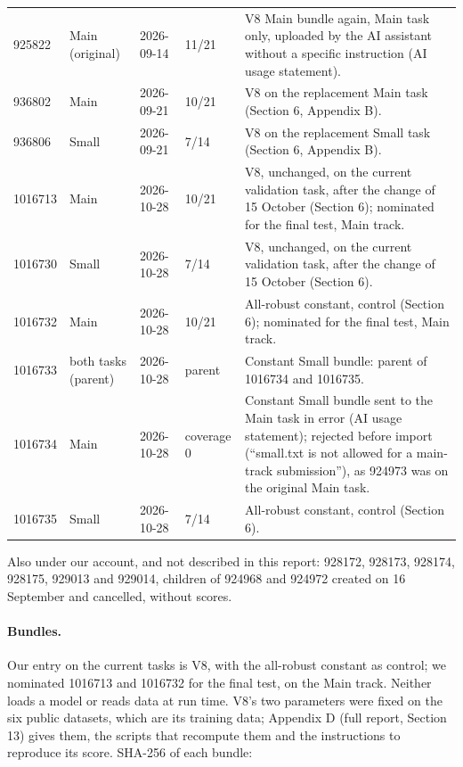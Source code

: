 {\begin{longtable}{L{1.3cm}L{1.9cm}L{1.7cm}L{1.5cm}L{5.9cm}}
925822 & Main (original) & 2026-09-14 & 11/21 & V8 Main bundle again, Main task only, uploaded by the AI assistant without a specific instruction (AI usage statement). \\

936802 & Main & 2026-09-21 & 10/21 & V8 on the replacement Main task (Section 6, Appendix B). \\

936806 & Small & 2026-09-21 & 7/14 & V8 on the replacement Small task (Section 6, Appendix B). \\

1016713 & Main & 2026-10-28 & 10/21 & V8, unchanged, on the current validation task, after the change of 15 October (Section 6); nominated for the final test, Main track. \\

1016730 & Small & 2026-10-28 & 7/14 & V8, unchanged, on the current validation task, after the change of 15 October (Section 6). \\

1016732 & Main & 2026-10-28 & 10/21 & All-robust constant, control (Section 6); nominated for the final test, Main track. \\

1016733 & both tasks (parent) & 2026-10-28 & parent & Constant Small bundle: parent of 1016734 and 1016735. \\

1016734 & Main & 2026-10-28 & coverage 0 & Constant Small bundle sent to the Main task in error (AI usage statement); rejected before import (``small.txt is not allowed for a main-track submission''), as 924973 was on the original Main task. \\

1016735 & Small & 2026-10-28 & 7/14 & All-robust constant, control (Section 6). \\

\end{longtable}

}

Also under our account, and not described in this report: 928172, 928173, 928174, 928175, 929013 and 929014, children of 924968 and 924972 created on 16 September and cancelled, without scores.

\paragraph{Bundles.} Our entry on the current tasks is V8, with the all-robust constant as control; we nominated 1016713 and 1016732 for the final test, on the Main track. Neither loads a model or reads data at run time. V8's two parameters were fixed on the six public datasets, which are its training data; Appendix D (full report, Section 13) gives them, the scripts that recompute them and the instructions to reproduce its score. SHA-256 of each bundle:

